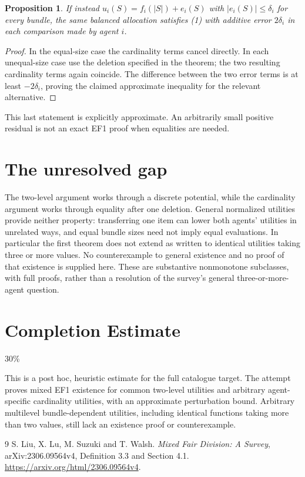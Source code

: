 \documentclass[11pt]{article}
\newtheorem{proposition}[theorem]{Proposition}
\theoremstyle{definition}
\begin{document}
\begin{proposition}
If instead $u_i(S)=f_i(|S|)+e_i(S)$ with
$|e_i(S)|\le\delta_i$ for every bundle, the same balanced allocation
satisfies (1) with additive error $2\delta_i$ in each comparison made
by agent $i$.
\end{proposition}
\begin{proof}
In the equal-size case the cardinality terms cancel directly. In each
unequal-size case use the deletion specified in the theorem; the two
resulting cardinality terms again coincide. The difference between the
two error terms is at least $-2\delta_i$, proving the claimed approximate
inequality for the relevant alternative.
\end{proof}
This last statement is explicitly approximate. An arbitrarily small
positive residual is not an exact EF1 proof when equalities are needed.

\section*{The unresolved gap}
The two-level argument works through a discrete potential, while the
cardinality argument works through equality after one deletion. General
normalized utilities provide neither property: transferring one item
can lower both agents' utilities in unrelated ways, and equal bundle
sizes need not imply equal evaluations. In particular the first theorem
does not extend as written to identical utilities taking three or more
values. No counterexample to general existence and no proof of that
existence is supplied here. These are substantive nonmonotone subclasses,
with full proofs, rather than a resolution of the survey's general
three-or-more-agent question.

\section{Completion Estimate}
30\%

This is a post hoc, heuristic estimate for the full catalogue target.
The attempt proves mixed EF1 existence for common two-level utilities and arbitrary agent-specific cardinality utilities, with an approximate perturbation bound. Arbitrary multilevel bundle-dependent utilities, including identical functions taking more than two values, still lack an existence proof or counterexample.

\begin{thebibliography}{9}
 S. Liu, X. Lu, M. Suzuki and T. Walsh.
\emph{Mixed Fair Division: A Survey}, arXiv:2306.09564v4,
Definition 3.3 and Section 4.1.
\url{https://arxiv.org/html/2306.09564v4}.
\end{thebibliography}
\end{document}
